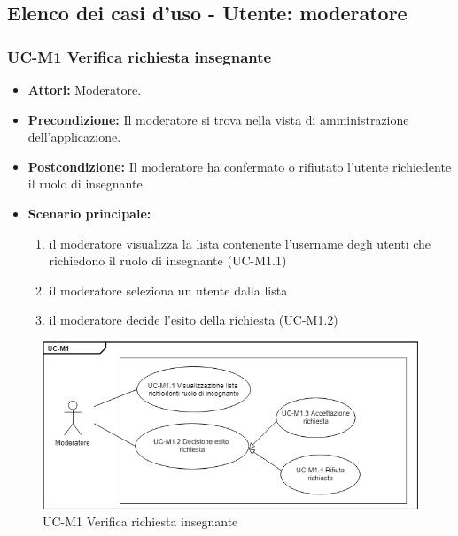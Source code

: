 \subsection{Elenco dei casi d'uso - Utente: moderatore}	
\subsubsection{UC-M1 Verifica richiesta insegnante}
		\begin{itemize}
			\item \textbf{Attori:} Moderatore.
			\item \textbf{Precondizione:} Il moderatore si trova nella vista di amministrazione dell'applicazione.
			\item \textbf{Postcondizione:} Il moderatore ha confermato o rifiutato l'utente richiedente il ruolo di insegnante.
			\item \textbf{Scenario principale:}
				\begin{enumerate}
					\item il moderatore visualizza la lista contenente l'username degli utenti che richiedono il ruolo di insegnante (UC-M1.1)
					\item il moderatore seleziona un utente dalla lista
					\item il moderatore decide l'esito della richiesta (UC-M1.2)
				\end{enumerate}
		\end{itemize}	
		\begin{figure}[h]
		\centering
		\includegraphics[scale=0.7]{images/UC-M1.png}
		\caption{UC-M1 Verifica richiesta insegnante}
	\end{figure}		
			
		
